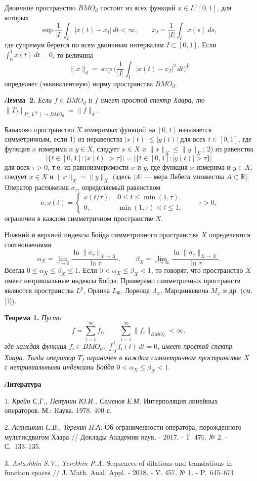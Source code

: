 Двоичное пространство $BMO_d$ состоит из всех функций $x\in L^1[0,1]$, для которых
$$
\sup\frac{1}{|I|}\int_I|x(t)-x_I|\,dt<\infty, \qquad x_I=\frac{1}{|I|}\int_Ix(s)\,ds,
$$
где супремум берется по всем двоичным интервалам $I\subset[0,1]$. Если $\int_0^1x(t)\,dt=0$, то величина
$$
\|x\|_d=\sup\biggl(\frac{1}{|I|}\int_I|x(t)-x_I|^2\,dt\biggr)^{\frac12}
$$
определяет (эквивалентную) норму пространства $BMO_d$.

\textbf{Лемма~2.} {\it Если $f\in BMO_d$ и $f$ имеет простой спектр Хаара, то $\|T_f\|_{P(L^{\infty})\to BMO_d}=\|f\|_d$.}

Банахово пространство $X$ измеримых функций на $[0,1]$ называется симметричным, если
1) из неравенства $|x(t)|\le|y(t)|$ для всех $t\in[0,1]$,
где функция $x$ измерима и $y\in X$, следует $x\in X$ и $\|x\|_X\le\|y\|_X$;
2) из равенства
$$
|\{t\in[0,1]:|x(t)|>\tau\}|=|\{t\in[0,1]:|y(t)|>\tau\}|
$$
для всех $\tau>0$, т.е. из равноизмеримости $x$ и $y$, где функция $x$ измерима и $y\in X$,
следует $x\in X$ и $\|x\|_X=\|y\|_X$ (здесь $|A|$ --- мера Лебега множества $A\subset\mathbb{R}$).
Оператор растяжения $\sigma_{\tau}$, определяемый равенством
$$
\sigma_{\tau}x(t)=\begin{cases}
x(t/\tau), & 0\le t\le\min(1,\tau),\\
0, & \min(1,\tau)<t\le1,
\end{cases}
\qquad \tau>0,
$$
ограничен в каждом симметричном пространстве $X$.

Нижний и верхний индексы Бойда симметричного пространства $X$ определяются соотношениями
$$
\alpha_X=\lim_{\tau\to0}\frac{\ln\|\sigma_{\tau}\|_{X\to X}}{\ln\tau}, \qquad
\beta_X=\lim_{\tau\to\infty}\frac{\ln\|\sigma_{\tau}\|_{X\to X}}{\ln\tau}.
$$
Всегда $0\le\alpha_X\le\beta_X\le1$. Если $0<\alpha_X\le\beta_X<1$, то говорят, что пространство $X$ имеет нетривиальные индексы Бойда.
Примерами симметричных пространств являются пространства $L^p$, Орлича $L_{\varPhi}$, Лоренца $\varLambda_{\varphi}$, Марцинкевича $M_{\varphi}$ и др. (см. [1]).

\textbf{Теорема 1.} {\it Пусть
$$
f=\sum_{i=1}^{\infty}f_i, \qquad \sum_{i=1}^{\infty}\|f_i\|_{BMO_d}<\infty,
$$
где каждая функция $f_i\in BMO_d$, $\int_0^1f_i(t)\,dt=0$, имеет простой спектр Хаара. Тогда оператор $T_f$ ограничен в каждом симметричном пространстве $X$ с нетривиальными индексами Бойда $0<\alpha_X\le\beta_X<1$.}


\smallskip \centerline{\bf Литература}\nopagebreak

1. {\it Крейн С.Г., Петунин Ю.И., Семенов Е.М.} Интерполяция линейных операторов. М.: Наука, 1978. 400 с.

2. {\it Асташкин С.В., Терехин П.А.} Об ограниченности оператора, порожденного мультисдвигом Хаара // Доклады Академии наук. - 2017. -
Т. 476, № 2. - С.~133--135.

3. {\it Astashkin S.V., Terekhin P.A.} Sequences of dilations and translations in function spaces // J. Math. Anal. Appl. - 2018. -
V. 457, № 1. - P.~645--671.
